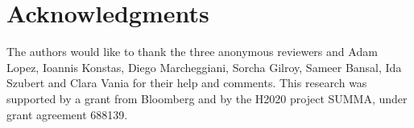\documentclass[11pt,a4paper]{article}
\begin{document}
\section*{Acknowledgments}

The authors would like to thank the three anonymous reviewers and Adam Lopez, Ioannis Konstas, Diego Marcheggiani, Sorcha Gilroy, Sameer Bansal, Ida Szubert and Clara Vania for their help and comments. This research was supported by a grant from Bloomberg and by the H2020 project SUMMA, under grant agreement 688139.




\end{document}
